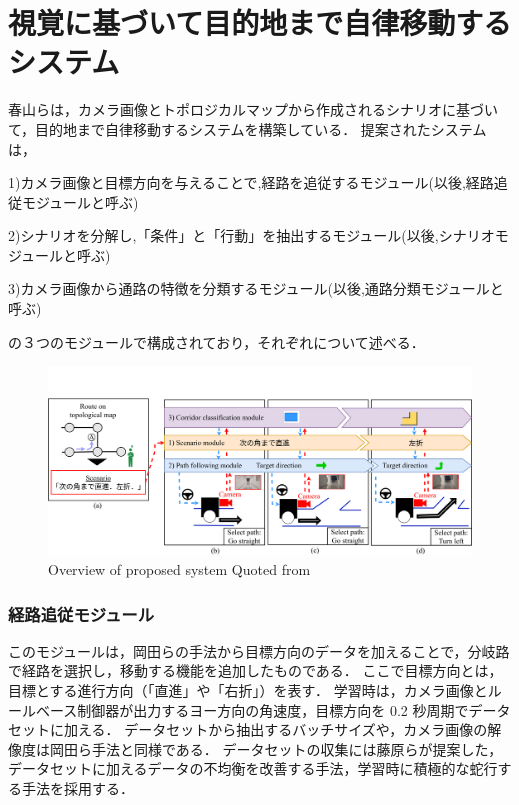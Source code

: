 \section{視覚に基づいて目的地まで自律移動するシステム}
春山らは，カメラ画像とトポロジカルマップから作成されるシナリオに基づいて，目的地まで自律移動するシステムを構築している．
提案されたシステムは，

1)カメラ画像と目標方向を与えることで,経路を追従するモジュール(以後,経路追従モジュールと呼ぶ)

2)シナリオを分解し,「条件」と「行動」を抽出するモジュール(以後,シナリオモジュールと呼ぶ)

3)カメラ画像から通路の特徴を分類するモジュール(以後,通路分類モジュールと呼ぶ)

の３つのモジュールで構成されており，それぞれについて述べる．

\begin{figure}[htbp]
  \centering
   \includegraphics[width=130mm]{images/pdf/haruyama/system.pdf}
   \caption{Overview of proposed system Quoted from \cite{haruyama2023}}
   \label{fig:sys}
\end{figure}

\subsubsection{経路追従モジュール}
このモジュールは，岡田らの手法から目標方向のデータを加えることで，分岐路で経路を選択し，移動する機能を追加したものである．
ここで目標方向とは，目標とする進行方向（「直進」や「右折」）を表す．
学習時は，カメラ画像とルールベース制御器が出力するヨー方向の角速度，目標方向を 0.2 秒周期でデータセットに加える．
データセットから抽出するバッチサイズや，カメラ画像の解像度は岡田ら手法と同様である．
データセットの収集には藤原らが提案した，データセットに加えるデータの不均衡を改善する手法，学習時に積極的な蛇行する手法を採用する．

